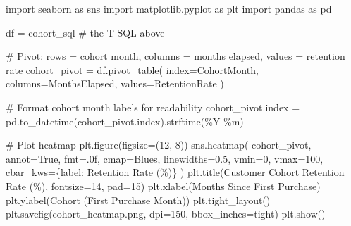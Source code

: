 \documentclass[
  letterpaper,
  DIV=11,
  numbers=noendperiod]{scrartcl}
\newenvironment{Shaded}{\begin{snugshade}}{\end{snugshade}}
\newcommand{\CommentTok}[1]{\textcolor[rgb]{0.37,0.37,0.37}{#1}}
\newcommand{\DecValTok}[1]{\textcolor[rgb]{0.68,0.00,0.00}{#1}}
\newcommand{\FloatTok}[1]{\textcolor[rgb]{0.68,0.00,0.00}{#1}}
\newcommand{\ImportTok}[1]{\textcolor[rgb]{0.00,0.46,0.62}{#1}}
\newcommand{\NormalTok}[1]{\textcolor[rgb]{0.00,0.23,0.31}{#1}}
\newcommand{\OperatorTok}[1]{\textcolor[rgb]{0.37,0.37,0.37}{#1}}
\newcommand{\StringTok}[1]{\textcolor[rgb]{0.13,0.47,0.30}{#1}}
\newcommand{\VariableTok}[1]{\textcolor[rgb]{0.07,0.07,0.07}{#1}}
\begin{document}
\begin{Shaded}
\begin{Highlighting}[]
\ImportTok{import}\NormalTok{ seaborn }\ImportTok{as}\NormalTok{ sns}
\ImportTok{import}\NormalTok{ matplotlib.pyplot }\ImportTok{as}\NormalTok{ plt}
\ImportTok{import}\NormalTok{ pandas }\ImportTok{as}\NormalTok{ pd}

\NormalTok{df }\OperatorTok{=}\NormalTok{ cohort\_sql }\CommentTok{\# the T{-}SQL above}

\CommentTok{\# Pivot: rows = cohort month, columns = months elapsed, values = retention rate}
\NormalTok{cohort\_pivot }\OperatorTok{=}\NormalTok{ df.pivot\_table(}
\NormalTok{    index}\OperatorTok{=}\StringTok{\textquotesingle{}CohortMonth\textquotesingle{}}\NormalTok{,}
\NormalTok{    columns}\OperatorTok{=}\StringTok{\textquotesingle{}MonthsElapsed\textquotesingle{}}\NormalTok{,}
\NormalTok{    values}\OperatorTok{=}\StringTok{\textquotesingle{}RetentionRate\textquotesingle{}}
\NormalTok{)}

\CommentTok{\# Format cohort month labels for readability}
\NormalTok{cohort\_pivot.index }\OperatorTok{=}\NormalTok{ pd.to\_datetime(cohort\_pivot.index).strftime(}\StringTok{\textquotesingle{}\%Y{-}\%m\textquotesingle{}}\NormalTok{)}

\CommentTok{\# Plot heatmap}
\NormalTok{plt.figure(figsize}\OperatorTok{=}\NormalTok{(}\DecValTok{12}\NormalTok{, }\DecValTok{8}\NormalTok{))}
\NormalTok{sns.heatmap(}
\NormalTok{    cohort\_pivot,}
\NormalTok{    annot}\OperatorTok{=}\VariableTok{True}\NormalTok{,}
\NormalTok{    fmt}\OperatorTok{=}\StringTok{\textquotesingle{}.0f\textquotesingle{}}\NormalTok{,}
\NormalTok{    cmap}\OperatorTok{=}\StringTok{\textquotesingle{}Blues\textquotesingle{}}\NormalTok{,}
\NormalTok{    linewidths}\OperatorTok{=}\FloatTok{0.5}\NormalTok{,}
\NormalTok{    vmin}\OperatorTok{=}\DecValTok{0}\NormalTok{, vmax}\OperatorTok{=}\DecValTok{100}\NormalTok{,}
\NormalTok{    cbar\_kws}\OperatorTok{=}\NormalTok{\{}\StringTok{\textquotesingle{}label\textquotesingle{}}\NormalTok{: }\StringTok{\textquotesingle{}Retention Rate (\%)\textquotesingle{}}\NormalTok{\}}
\NormalTok{)}
\NormalTok{plt.title(}\StringTok{\textquotesingle{}Customer Cohort Retention Rate (\%)\textquotesingle{}}\NormalTok{, fontsize}\OperatorTok{=}\DecValTok{14}\NormalTok{, pad}\OperatorTok{=}\DecValTok{15}\NormalTok{)}
\NormalTok{plt.xlabel(}\StringTok{\textquotesingle{}Months Since First Purchase\textquotesingle{}}\NormalTok{)}
\NormalTok{plt.ylabel(}\StringTok{\textquotesingle{}Cohort (First Purchase Month)\textquotesingle{}}\NormalTok{)}
\NormalTok{plt.tight\_layout()}
\NormalTok{plt.savefig(}\StringTok{\textquotesingle{}cohort\_heatmap.png\textquotesingle{}}\NormalTok{, dpi}\OperatorTok{=}\DecValTok{150}\NormalTok{, bbox\_inches}\OperatorTok{=}\StringTok{\textquotesingle{}tight\textquotesingle{}}\NormalTok{)}
\NormalTok{plt.show()}
\end{Highlighting}
\end{Shaded}
\end{document}
